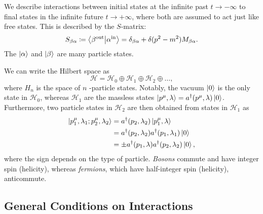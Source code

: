 
We describe interactions between initial states at the infinite past $t \to -\infty$ to final states in the infinite future $t \to +\infty$, where both are assumed to act just like free states.
This is described by the $S$-matrix:
\begin{equation}
  S_{\beta\alpha} \coloneqq \bra{\beta^{\text{out}}}\ket{\alpha^{\text{in}}} = \delta_{\beta\alpha} + \delta(p^2 -m^2) M_{\beta\alpha}.
\end{equation}
The $\ket{\alpha}$  and $\ket{\beta}$  are many particle states.

We can write the Hilbert space as
\begin{equation}
  \mathcal{H} = \mathcal{H}_0 \oplus \mathcal{H}_1 \oplus \mathcal{H}_2 \oplus \dots,
\end{equation}
where $H_n$  is the space of $n$ -particle states.
Notably, the vacuum $\ket{0}$ is the only state in $\mathcal{H}_0$, whereas $\mathcal{H}_1$ are the massless states $\ket{p^{\mu}, \lambda} = a^{\dagger}(p^{\mu}, \lambda) \ket{0}$.
Furthermore, two particle states in $\mathcal{H}_2$  are then obtained from states in $\mathcal{H}_1$ as
\begin{align}
  \ket{p^{\mu}_1, \lambda_1; p^{\mu}_2, \lambda_2} &= a^{\dagger}(p_2, \lambda_2) \ket{p^{\mu}_1, \lambda} \\
  &= a^{\dagger}(p_2, \lambda_2) a^{\dagger}(p_1, \lambda_1) \ket{0} \\
  &= \pm a^{\dagger}(p_1, \lambda) a^{\dagger}(p_2, \lambda_2) \ket{0},
\end{align}
where the sign depends on the type of particle. \emph{Bosons} commute and have integer spin (helicity), whereas \emph{fermions}, which have half-integer spin (helicity), anticommute.

\subsection{General Conditions on Interactions}%
\label{sub:general_conditions_on_interactions}

